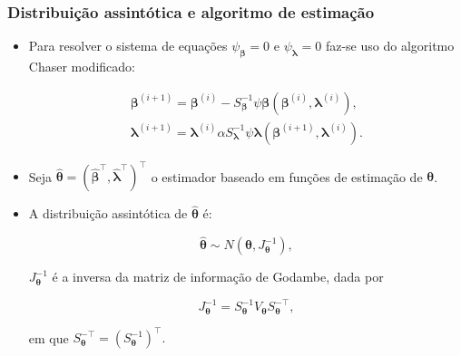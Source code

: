 \documentclass[10pt,
  aspectratio=169,
  serif,
  mathserif,
  professionalfont,
  compress,
  handout,
  ]{beamer}\usepackage[]{graphicx}\usepackage[]{color}
\begin{document}
\begin{frame}

\frametitle{Distribuição assintótica e algoritmo de estimação}

\begin{itemize}

  \item Para resolver o sistema de equações $\psi_{\boldsymbol{\beta}} = 0$ e $\psi_{\boldsymbol{\lambda}} = 0$ faz-se uso do algoritmo Chaser modificado:

$$
\begin{matrix}
\boldsymbol{\beta}^{(i+1)} = \boldsymbol{\beta}^{(i)}- S_{\boldsymbol{\beta}}^{-1} \psi \boldsymbol{\beta} (\boldsymbol{\beta}^{(i)}, \boldsymbol{\lambda}^{(i)}), \\ 
\boldsymbol{\lambda}^{(i+1)} = \boldsymbol{\lambda}^{(i)}\alpha S_{\boldsymbol{\lambda}}^{-1} \psi \boldsymbol{\lambda} (\boldsymbol{\beta}^{(i+1)}, \boldsymbol{\lambda}^{(i)}).
\end{matrix}
$$

  \item Seja $\boldsymbol{\hat{\theta}} = (\boldsymbol{\hat{\beta}^{\top}}, \boldsymbol{\hat{\lambda}^{\top}})^{\top}$ o estimador baseado em funções de estimação de $\boldsymbol{\theta}$.
  
  \item A distribuição assintótica de $\boldsymbol{\hat{\theta}}$ é:

$$
\boldsymbol{\hat{\theta}} \sim N(\boldsymbol{\theta}, J_{\boldsymbol{\theta}}^{-1}),
$$

\noindent $J_{\boldsymbol{\theta}}^{-1}$ é a inversa da matriz de informação de Godambe, dada por
  
$$J_{\boldsymbol{\theta}}^{-1} = S_{\boldsymbol{\theta}}^{-1} V_{\boldsymbol{\theta}} S_{\boldsymbol{\theta}}^{-\top},$$ 

\noindent em que $S_{\boldsymbol{\theta}}^{-\top} = (S_{\boldsymbol{\theta}}^{-1})^{\top}.$

\end{itemize}

\end{frame}

\end{document}
